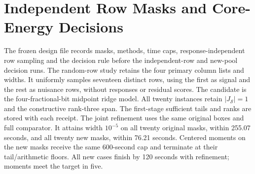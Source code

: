 \section{Independent Row Masks and Core-Energy Decisions}\label{app:core-decisions-v91}
The frozen design file records masks, methods, time caps, response-independent row sampling and the decision rule before the independent-row and new-pool decision runs. The random-row study retains the four primary column lists and widths. It uniformly samples seventeen distinct rows, using the first as signal and the rest as nuisance rows, without responses or residual scores. The candidate is the four-fractional-bit midpoint ridge model. All twenty instances retain $|J_{\mathcal S}|=1$ and the constructive rank-three span. The first-stage sufficient tails and ranks are stored with each receipt. The joint refinement uses the same original boxes and full comparator. It attains width $10^{-5}$ on all twenty original masks, within 255.07 seconds, and all twenty new masks, within 76.21 seconds. Centered moments on the new masks receive the same 600-second cap and terminate at their tail/arithmetic floors. All new cases finish by 120 seconds with refinement; moments meet the target in five.

